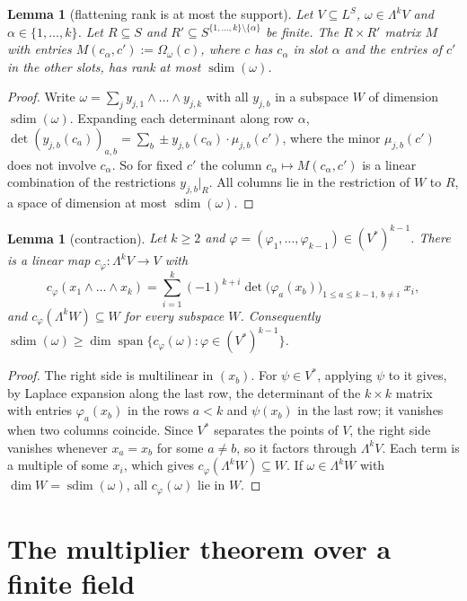 \documentclass[11pt]{amsart}
\newtheorem{lemma}[theorem]{Lemma}
\theoremstyle{definition}
\theoremstyle{remark}
\numberwithin{equation}{section}
\newcommand{\spn}{\operatorname{span}}
\newcommand{\sdim}{\operatorname{sdim}}
\begin{document}
\begin{lemma}[flattening rank is at most the support]\label{lem:flat}
Let $V\subseteq L^S$, $\omega\in\Lambda^kV$ and $\alpha\in\{1,\dots,k\}$. Let $R\subseteq S$ and
$R'\subseteq S^{\{1,\dots,k\}\setminus\{\alpha\}}$ be finite. The $R\times R'$ matrix $M$ with entries
$M(c_\alpha,c'):=\Omega_\omega(c)$, where $c$ has $c_\alpha$ in slot $\alpha$ and the entries of $c'$ in the other
slots, has rank at most $\sdim(\omega)$.
\end{lemma}

\begin{proof}
Write $\omega=\sum_jy_{j,1}\wedge\dots\wedge y_{j,k}$ with all $y_{j,b}$ in a subspace $W$ of dimension $\sdim(\omega)$.
Expanding each determinant along row $\alpha$,
$\det(y_{j,b}(c_a))_{a,b}=\sum_b\pm y_{j,b}(c_\alpha)\cdot\mu_{j,b}(c')$, where the minor $\mu_{j,b}(c')$ does not
involve $c_\alpha$. So for fixed $c'$ the column $c_\alpha\mapsto M(c_\alpha,c')$ is a linear combination of the
restrictions $y_{j,b}|_R$. All columns lie in the restriction of $W$ to $R$, a space of dimension at most
$\sdim(\omega)$.
\end{proof}

\begin{lemma}[contraction]\label{lem:contr}
Let $k\ge2$ and $\varphi=(\varphi_1,\dots,\varphi_{k-1})\in(V^*)^{k-1}$. There is a linear map $c_\varphi\colon\Lambda^kV\to V$
with
\[
c_\varphi(x_1\wedge\dots\wedge x_k)=\sum_{i=1}^k(-1)^{k+i}\det\bigl(\varphi_a(x_b)\bigr)_{1\le a\le k-1,\ b\ne i}\;x_i ,
\]
and $c_\varphi(\Lambda^kW)\subseteq W$ for every subspace $W$. Consequently
$\sdim(\omega)\ge\dim\spn\{c_\varphi(\omega):\varphi\in(V^*)^{k-1}\}$.
\end{lemma}

\begin{proof}
The right side is multilinear in $(x_b)$. For $\psi\in V^*$, applying $\psi$ to it gives, by Laplace expansion along the
last row, the determinant of the $k\times k$ matrix with entries $\varphi_a(x_b)$ in the rows $a<k$ and $\psi(x_b)$ in the last
row; it vanishes when two columns coincide. Since $V^*$ separates the points of $V$, the right side
vanishes whenever $x_a=x_b$ for some $a\ne b$, so it factors through $\Lambda^kV$. Each term is a multiple of some $x_i$, which gives
$c_\varphi(\Lambda^kW)\subseteq W$. If $\omega\in\Lambda^kW$ with $\dim W=\sdim(\omega)$, all $c_\varphi(\omega)$ lie in $W$.
\end{proof}

\section{The multiplier theorem over a finite field}\label{sec:FF}
\end{document}
